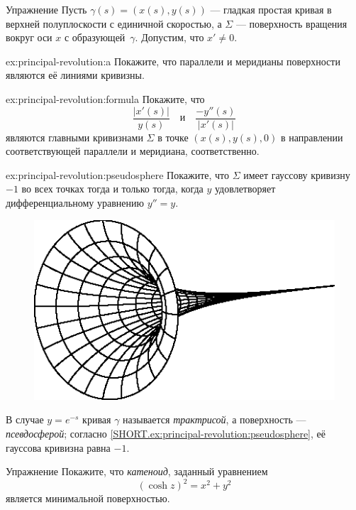 \begin{thm}{Упражнение}\label{ex:principal-revolution}
Пусть $\gamma(s)=(x(s),y(s))$ --- гладкая простая кривая в верхней полуплоскости с единичной скоростью,
а $\Sigma$ --- поверхность вращения вокруг оси $x$ с образующей~$\gamma$.
Допустим, что $x'\ne 0$.

\begin{subthm}{ex:principal-revolution:a}
Покажите, что параллели и меридианы поверхности являются её линиями кривизны.
\end{subthm}

{\sloppy

\begin{subthm}{ex:principal-revolution:formula}
Покажите, что 
\[\frac{|x'(s)|}{y(s)}
\quad
\text{и}
\quad
\frac{-y''(s)}{|x'(s)|}
\]
являются главными кривизнами $\Sigma$ в точке $(x(s),y(s),0)$ в направлении соответствующей параллели и меридиана, соответственно.
\end{subthm}

}

\begin{subthm}{ex:principal-revolution:pseudosphere}
Покажите, что $\Sigma$ имеет гауссову кривизну $-1$ во всех точках тогда и только тогда, когда $y$ удовлетворяет дифференциальному уравнению $y''=y$. 

\end{subthm}

\end{thm}

{

\begin{figure}
\vskip-6mm
\includegraphics{asy/pseudosphere}
\vskip-3mm
\end{figure}

В случае $y=e^{-s}$ кривая \( \gamma \) называется \emph{трактрисой}, а поверхность — \emph{псевдосферой};
согласно \ref{SHORT.ex:principal-revolution:pseudosphere}, её гауссова кривизна равна \( -1 \).

\begin{thm}{Упражнение}\label{ex:catenoid-is-minimal}
Покажите, что \emph{катеноид}, заданный уравнением
\[(\cosh z)^2=x^2+y^2\]
является минимальной поверхностью.
\end{thm}

}

